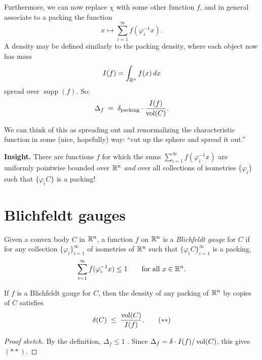 Furthermore, we can now replace $\chi$ with some other function $f$, and in general associate to a packing
the function
\[
x\longmapsto\sum_{i=1}^\infty f(\varphi_i^{-1}x).
\]
A density may be defined similarly to the packing density, where each object now has mass
\[
I(f)=\int_{\mathbb{R}^n}f(x)\,dx
\]
spread over $\operatorname{supp}(f)$. So:
\[
\Delta_f \;=\; \delta_{\text{packing}}\cdot\frac{I(f)}{\operatorname{vol}(C)}.
\]

We can think of this as spreading out and renormalizing the characteristic function in some (nice,
hopefully) way: ``cut up the sphere and spread it out.''

\textbf{Insight.} There are functions $f$ for which the sums $\sum_{i=1}^\infty f(\varphi_i^{-1}x)$ are
uniformly pointwise bounded over $\mathbb{R}^n$ \emph{and} over all collections of isometries $\{\varphi_i\}$ such
that $\{\varphi_iC\}$ is a packing!

\section{Blichfeldt gauges}\label{L2:sec:gauge}

\begin{definition}\label{L2:def:gauge}
Given a convex body $C$ in $\mathbb{R}^n$, a  function $f$ on $\mathbb{R}^n$ is a
\emph{Blichfeldt gauge} for $C$ if for any collection $\{\varphi_i\}_{i=1}^\infty$ of isometries of
$\mathbb{R}^n$ such that $\{\varphi_iC\}_{i=1}^\infty$ is a packing,
\[
\sum_{i=1}^\infty f(\varphi_i^{-1}x)\le 1 \qquad\text{for all } x\in\mathbb{R}^n.
\]
\end{definition}

\begin{lemma}\label{L2:lem:gauge}
If $f$ is a Blichfeldt gauge for $C$, then the density of any packing of $\mathbb{R}^n$ by copies of $C$ satisfies
\[
\delta(C)\;\le\;\frac{\operatorname{vol}(C)}{I(f)}. \tag{$**$}
\]
\end{lemma}

\begin{proof}[Proof sketch]
By the definition, $\Delta_f\le 1$ .
Since $\Delta_f=\delta\cdot I(f)/\operatorname{vol}(C)$, this gives $(**)$. 
\end{proof}


